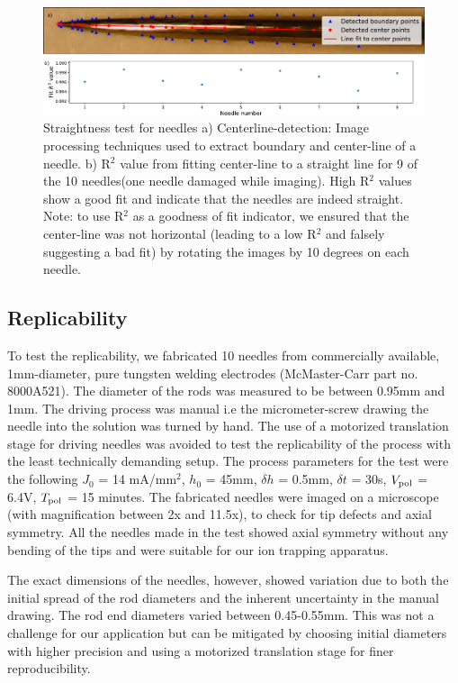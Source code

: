 \documentclass[%
 aip,
 amsmath,amssymb,
 reprint,%
]{revtex4-1}
\begin{document}
\begin{figure}
    \centering
    \includegraphics[width =1.0\linewidth]{needle_straightness_test.pdf}
    \caption{Straightness test for needles a) Centerline-detection: Image processing techniques used to extract boundary and center-line of a needle. b) R$^2$ value from fitting center-line to a straight line for 9 of the 10 needles(one needle damaged while imaging). High R$^2$ values show a good fit and indicate that the needles are indeed straight. Note: to use R$^2$ as a goodness of fit indicator, we ensured that the center-line was not horizontal (leading to a low R$^2$ and falsely suggesting a bad fit) by rotating the images by 10 degrees on each needle.}
    \label{needle_straightness_test}
\end{figure}


\subsection{Replicability}
To test the replicability, we fabricated 10 needles from commercially available, 1mm-diameter, pure tungsten welding electrodes (McMaster-Carr part no. 8000A521). 
The diameter of the rods was measured to be between 0.95mm and 1mm. 
The driving process was manual i.e the micrometer-screw drawing the needle into the solution was turned by hand. 
The use of a motorized translation stage for driving needles was avoided to test the replicability of the process with the least technically demanding setup. 
The process parameters for the test were the following $J_0$ = 14 mA/mm$^2$, $h_0$ = 45mm, $\delta h$ = 0.5mm, $\delta t$ = 30s, $V_{\rm{pol}}$ = 6.4V, $T_{\rm{pol}}$ = 15 minutes.
The fabricated needles were imaged on a microscope (with magnification between 2x and 11.5x), to check for tip defects and axial symmetry. 
All the needles made in the test showed axial symmetry without any bending of the tips and were suitable for our ion trapping apparatus.
 
The exact dimensions of the needles, however, showed variation due to both the initial spread of the rod diameters and the inherent uncertainty in the manual drawing. 
The rod end diameters varied between 0.45-0.55mm.
This was not a challenge for our application but can be mitigated by choosing initial diameters with higher precision and using a motorized translation stage for finer reproducibility.
\end{document}
